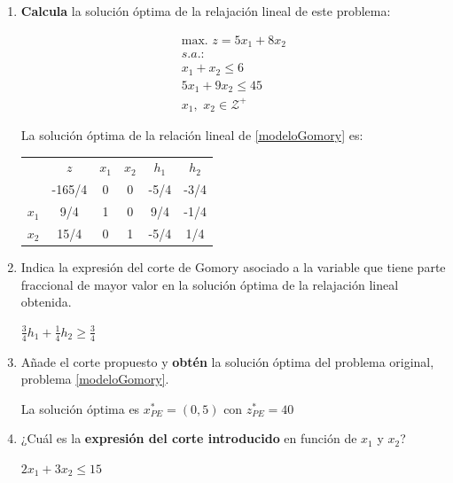 \begin{enumerate}
    \item \textbf{Calcula} la solución óptima de la relajación lineal de este problema:
    
\begin{equation}
\begin{split}
\mbox{max. } z = 5x_1 + 8x_2\\
s.a.:\\
x_1 + x_2 \leq  6\\
5x_1 + 9x_2 \leq 45\\
x_1,\,\,x_2 \in  \mathcal{Z}^+
\end{split}
\label{modeloGomory}
\end{equation}

 La solución óptima de la relación lineal de \eqref{modeloGomory} es:

\begin{center}
\begin{tabular}{c|c|cccc|}
 & $z$ & $x_1$ & $x_2$ &  $h_1$ & $h_2$ \\ 
 & -165/4 & 0 & 0  & -5/4 & -3/4\\ 
\hline
$x_1$ & 9/4  & 1 & 0 & 9/4 & -1/4\\ 
$x_2$ & 15/4  & 0 & 1 & -5/4 & 1/4\\ 
\hline
\end{tabular}
\end{center}

    \item{\textbf{}{Indica} la expresión del corte de Gomory asociado a la variable que tiene parte fraccional de mayor valor en la solución óptima de la relajación lineal obtenida.}

   $\frac{3}{4} h_1 + \frac{1}{4} h_2 \geq \frac{3}{4}$

    
    \item {Añade el corte propuesto y \textbf{obtén} la solución óptima del problema original, problema \eqref{modeloGomory}}.

    La solución óptima es $x^*_{PE}=(0,5)$ con $z^*_{PE}=40$
    \item ¿Cuál es la \textbf{expresión del corte introducido} en función de $x_1$ y $x_2$?
    
    $2x_1+3x_2 \leq 15$
    

\end{enumerate}